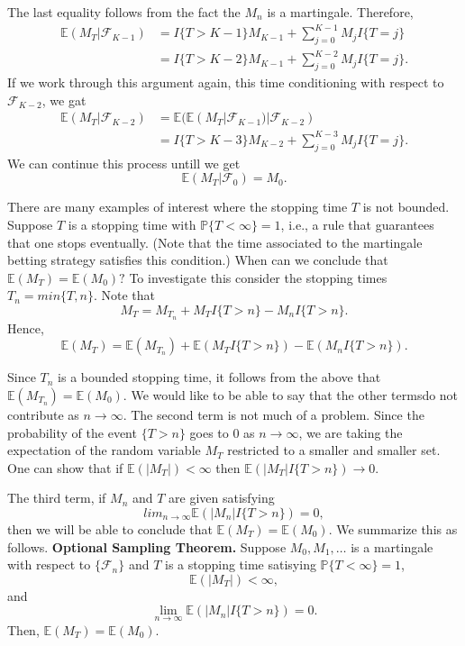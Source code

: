 \documentclass[a4paper,english,10pt]{article}
\begin{document}
The last equality follows from the fact the $M_n$ is a martingale. Therefore,
\begin{align*}
\mathbb{E}(M_T|\mathcal{F}_{K-1}) &=I\{T>K-1\}M_{K-1}+\sum_{j=0}^{K-1}M_jI\{T=j\}\\
								   &=I\{T>K-2\}M_{K-1}+\sum_{j=0}^{K-2}M_jI\{T=j\}.
\end{align*}
If we work through this argument again, this time conditioning with respect to $\mathcal{F}_{K-2}$, we gat
\begin{align*}
\mathbb{E}(M_T|\mathcal{F}_{K-2}) &=\mathbb{E}(\mathbb{E}(M_T|\mathcal{F}_{K-1})|\mathcal{F}_{K-2})\\
								   &=I\{T>K-3\}M_{K-2}+\sum_{j=0}^{K-3}M_jI\{T=j\}.
\end{align*}
We can continue this process untill we get
\begin{equation*}
\mathbb{E}(M_T|\mathcal{F}_0)=M_0.
\end{equation*}

There are many examples of interest where the stopping time $T$ is not bounded. Suppose $T$ is a stopping time with $\mathbb{P}\{T<\infty\}=1$, i.e., a rule that guarantees that one stops eventually. (Note that the time associated to the martingale betting strategy satisfies this condition.) When can we conclude that $\mathbb{E}(M_T)=\mathbb{E}(M_0)?$ To investigate this consider the stopping times $T_n=min\{T,n\}$. Note that
\begin{equation*}
M_T=M_{T_{n}}+M_TI\{T>n\}-M_nI\{T>n\}.
\end{equation*}
Hence,
\begin{equation*}
\mathbb{E}(M_T)=\mathbb{E}(M_{T_{n}})+\mathbb{E}(M_TI\{T>n\})-\mathbb{E}(M_nI\{T>n\}).
\end{equation*}

Since $T_n$ is a bounded stopping time, it follows from the above that $\mathbb{E}(M_{T_{n}})=\mathbb{E}(M_0)$. We would like to be able to say that the other termsdo not contribute as $n\rightarrow \infty$. The second term is not much of a problem.  Since the probability of the event $\{T>n\}$ goes to 0 as $n\rightarrow \infty$, we are taking the expectation of the random variable $M_T$ restricted to a smaller and smaller set. One can show that if $\mathbb{E}(|M_T|)<\infty$ then $\mathbb{E}(|M_T|I\{T>n\}) \rightarrow 0$.

The third term, if $M_n$ and $T$ are given satisfying
\begin{equation*}
lim_{n\rightarrow \infty}\mathbb{E}(|M_n|I\{T>n\})=0,
\end{equation*}
then we will be able to conclude that $\mathbb{E}(M_T)=\mathbb{E}(M_0)$. We summarize this as follows.\newline
\textbf{Optional Sampling Theorem.} Suppose $M_0,M_1,\dots$ is a martingale with respect to $\{\mathcal{F}_n\}$ and $T$ is a stopping time satisying $\mathbb{P}\{T<\infty\}=1$,
\begin{equation*}
\mathbb{E}(|M_T|)<\infty,
\end{equation*}
and
\begin{equation*}
\lim_{n\rightarrow \infty}\mathbb{E}(|M_n|I\{T>n\})=0.
\end{equation*}
Then, $\mathbb{E}(M_T)=\mathbb{E}(M_0)$.
\end{document}
